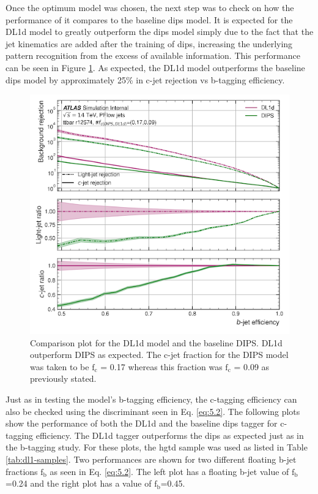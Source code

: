 Once the optimum model was chosen, the next step was to check on how the performance of it compares to the baseline \gls{dips} model. It is expected for the DL1d model to greatly outperform 
the \gls{dips} model simply due to the fact that the jet kinematics are added after the training of \gls{dips}, increasing the underlying pattern recognition from the excess of available information. 
This performance can be seen in Figure \ref{fig:dl1d-dips-comp}. As expected, the DL1d model outperforms the baseline \gls{dips} model by approximately 25\% in c-jet rejection vs b-tagging efficiency.

\begin{figure}[h]
    \centering
    \includegraphics[scale=0.75]{figs/ch5/rejveff_dl1dcdips.png}
    \caption{ Comparison plot for the DL1d model and the baseline DIPS. DL1d outperform DIPS as expected. The c-jet fraction for the DIPS model was taken to be $\textrm{f}_{\textrm{c}}$ = 0.17 whereas 
    this fraction was $\textrm{f}_{\textrm{c}}$ = 0.09 as previously stated. }
\label{fig:dl1d-dips-comp}
\end{figure}

Just as in testing the model's b-tagging efficiency, the c-tagging efficiency can also be checked using the discriminant seen in Eq. \ref{eq:5.2}. The following plots show the performance of both 
the DL1d and the baseline \gls{dips} tagger for c-tagging efficiency. The DL1d tagger outperforms the \gls{dips} as expected just as in the b-tagging study. For these plots, the \gls{hgtd} sample 
was used as listed in Table \ref{tab:dl1-samples}. Two performances are shown for two different floating b-jet fractions $\textrm{f}_{\textrm{b}}$ as seen in Eq. \ref{eq:5.2}. The left plot 
has a floating b-jet value of $\textrm{f}_{\textrm{b}}$=0.24 and the right plot has a value of $\textrm{f}_{\textrm{b}}$=0.45.

